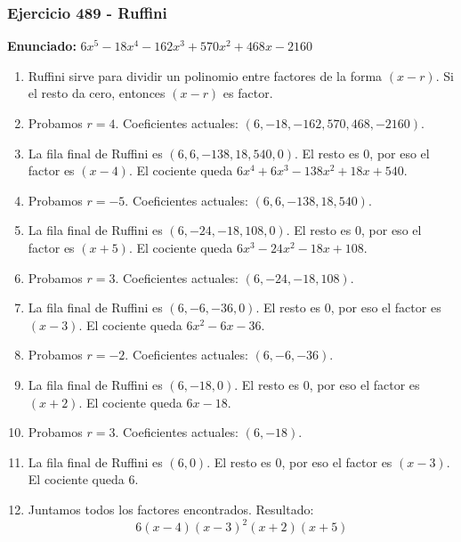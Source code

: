 \documentclass[11pt,a4paper]{article}
\begin{document}
\subsubsection*{Ejercicio 489 - Ruffini}
\textbf{Enunciado:} $ 6 x^{5} - 18 x^{4} - 162 x^{3} + 570 x^{2} + 468 x - 2160 $\par
\begin{enumerate}[leftmargin=2em]
\item Ruffini sirve para dividir un polinomio entre factores de la forma \((x-r)\). Si el resto da cero, entonces \((x-r)\) es factor.
\item Probamos \(r=4\). Coeficientes actuales: \((6, -18, -162, 570, 468, -2160)\).
\item La fila final de Ruffini es \((6, 6, -138, 18, 540, 0)\). El resto es \(0\), por eso el factor es \((x-4)\). El cociente queda \(6 x^{4} + 6 x^{3} - 138 x^{2} + 18 x + 540\).
\item Probamos \(r=-5\). Coeficientes actuales: \((6, 6, -138, 18, 540)\).
\item La fila final de Ruffini es \((6, -24, -18, 108, 0)\). El resto es \(0\), por eso el factor es \((x+5)\). El cociente queda \(6 x^{3} - 24 x^{2} - 18 x + 108\).
\item Probamos \(r=3\). Coeficientes actuales: \((6, -24, -18, 108)\).
\item La fila final de Ruffini es \((6, -6, -36, 0)\). El resto es \(0\), por eso el factor es \((x-3)\). El cociente queda \(6 x^{2} - 6 x - 36\).
\item Probamos \(r=-2\). Coeficientes actuales: \((6, -6, -36)\).
\item La fila final de Ruffini es \((6, -18, 0)\). El resto es \(0\), por eso el factor es \((x+2)\). El cociente queda \(6 x - 18\).
\item Probamos \(r=3\). Coeficientes actuales: \((6, -18)\).
\item La fila final de Ruffini es \((6, 0)\). El resto es \(0\), por eso el factor es \((x-3)\). El cociente queda \(6\).
\item Juntamos todos los factores encontrados. Resultado: \[\boxed{6 \left(x - 4\right) \left(x - 3\right)^{2} \left(x + 2\right) \left(x + 5\right)}\]
\end{enumerate}

\vspace{0.2cm}
\end{document}
